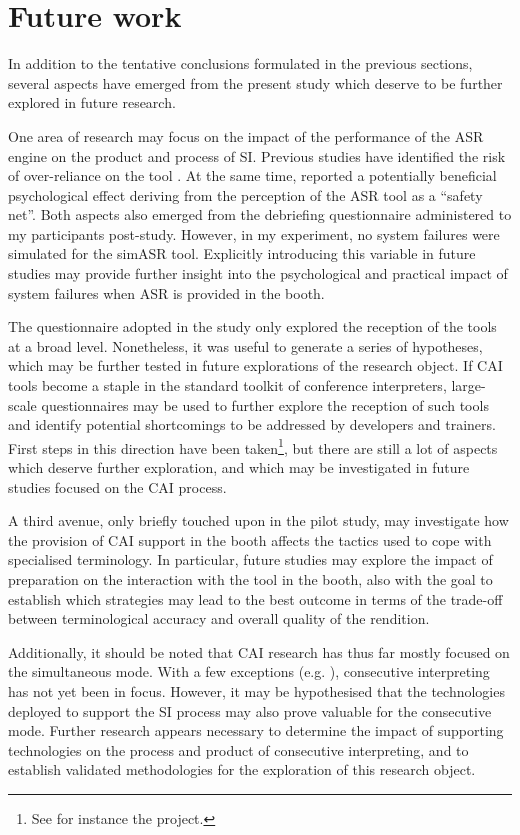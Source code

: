 \section{Future work} \label{futurework}
In addition to the tentative conclusions formulated in the previous sections, several aspects have emerged from the present study which deserve to be further explored in future research.

One area of research may focus on the impact of the performance of the ASR engine on the product and process of SI. Previous studies have identified the risk of over-reliance on the tool \citep{prandi_uso_2015,prandi_use_2015,defrancq_automatic_2020,van_cauwenberghe_etude_2020}. At the same time, \citet[87]{defrancq_automatic_2020} reported a potentially beneficial psychological effect deriving from the perception of the ASR tool as a ``safety net''. Both aspects also emerged from the debriefing questionnaire administered to my participants post-study. However, in my experiment, no system failures were simulated for the simASR tool. Explicitly introducing this variable in future studies may provide further insight into the psychological and practical impact of system failures when ASR is provided in the booth.

The questionnaire adopted in the study only explored the reception of the tools at a broad level. Nonetheless, it was useful to generate a series of hypotheses, which may be further tested in future explorations of the research object. If CAI tools become a staple in the standard toolkit of conference interpreters, large-scale questionnaires may be used to further explore the reception of such tools and identify potential shortcomings to be addressed by developers and trainers. First steps in this direction have been taken\footnote{See for instance the \citet{EABM2021} project.}, but there are still a lot of aspects which deserve further exploration, and which may be investigated in future studies focused on the CAI process.

A third avenue, only briefly touched upon in the pilot study, may investigate how the provision of CAI support in the booth affects the tactics used to cope with specialised terminology. In particular, future studies may explore the impact of preparation on the interaction with the tool in the booth, also with the goal to establish which strategies may lead to the best outcome in terms of the trade-off between terminological accuracy and overall quality of the rendition.

Additionally, it should be noted that CAI research has thus far mostly focused on the simultaneous mode. With a few exceptions (e.g. \citealt{wang2019can}), consecutive interpreting has not yet been in focus. However, it may be hypothesised that the technologies deployed to support the SI process may also prove valuable for the consecutive mode. Further research appears necessary to determine the impact of supporting technologies on the process and product of consecutive interpreting, and to establish validated methodologies for the exploration of this research object.

